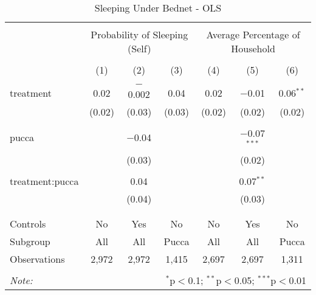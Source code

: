 
\begin{table}[!htbp] \centering 
  \caption{Sleeping Under Bednet - OLS} 
  \label{tbl:Sleeping Under Bednet - OLS} 
\begin{tabular}{@{\extracolsep{5pt}}lcccccc} 
\\[-1.8ex]\hline 
\hline \\[-1.8ex] 
 & \multicolumn{3}{c}{Probability of Sleeping (Self)} & \multicolumn{3}{c}{Average Percentage of Household} \\ 
\\[-1.8ex] & (1) & (2) & (3) & (4) & (5) & (6)\\ 
\hline \\[-1.8ex] 
 treatment & 0.02 & $-$0.002 & 0.04 & 0.02 & $-$0.01 & 0.06$^{**}$ \\ 
  & (0.02) & (0.03) & (0.03) & (0.02) & (0.02) & (0.02) \\ 
  & & & & & & \\ 
 pucca &  & $-$0.04 &  &  & $-$0.07$^{***}$ &  \\ 
  &  & (0.03) &  &  & (0.02) &  \\ 
  & & & & & & \\ 
 treatment:pucca &  & 0.04 &  &  & 0.07$^{**}$ &  \\ 
  &  & (0.04) &  &  & (0.03) &  \\ 
  & & & & & & \\ 
\hline \\[-1.8ex] 
Controls & No & Yes & No & No & Yes & No \\ 
Subgroup & All & All & Pucca & All & All & Pucca \\ 
Observations & 2,972 & 2,972 & 1,415 & 2,697 & 2,697 & 1,311 \\ 
\hline 
\hline \\[-1.8ex] 
\textit{Note:}  & \multicolumn{6}{r}{$^{*}$p$<$0.1; $^{**}$p$<$0.05; $^{***}$p$<$0.01} \\ 
\end{tabular} 
\end{table} 
